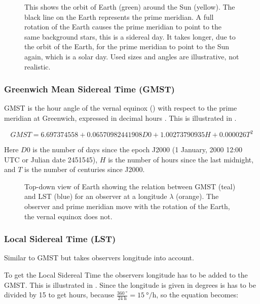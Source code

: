 \begin{figure}
    \centering
    
    \caption{This shows the orbit of Earth (green) around the Sun
             (yellow). The black line on the Earth represents the prime
             meridian. A full rotation of the Earth causes the prime
             meridian to point to the same background stars, this is a
             sidereal day. It takes longer, due to the orbit of the
             Earth, for the prime meridian to point to the Sun again,
             which is a solar day. Used sizes and angles are
             illustrative, not realistic.}
    \label{fig:sidereal_time}
\end{figure}


\subsubsection{Greenwich Mean Sidereal Time (GMST)}

GMST is the hour angle of the vernal equinox ()
with respect to the prime meridian at Greenwich, expressed in decimal
hours \cite{kaplan:2011aa}. This is illustrated in
.

\begin{equation}
    GMST = 6.697374558 + 0.06570982441908 D0 + 1.00273790935 H + 0.000026 T^2
\end{equation}

Here $D0$ is the number of days since the epoch J2000 (1 January, 2000
12:00 UTC or Julian date 2451545), $H$ is the number of hours since the
last midnight, and $T$ is the number of centuries since J2000.

\begin{figure}
    \centering
    
    \caption{Top-down view of Earth showing the relation between GMST
             (teal) and LST (blue) for an observer at a longitude
             $\lambda$ (orange). The observer and prime meridian move with
             the rotation of the Earth, the vernal equinox does not.}
    \label{fig:wgs84_gmst_lst}
\end{figure}


\subsubsection{Local Sidereal Time (LST)}

Similar to GMST but takes observers longitude into account.

To get the Local Sidereal Time the observers longitude has to be added
to the GMST. This is illustrated in . Since
the longitude is given in degrees is has to be divided by 15 to get
hours, because $\frac{\SI{360}{\degree}}{\SI{24}{\hour}} =
\SI{15}{\degree\per\hour}$, so the equation becomes:

